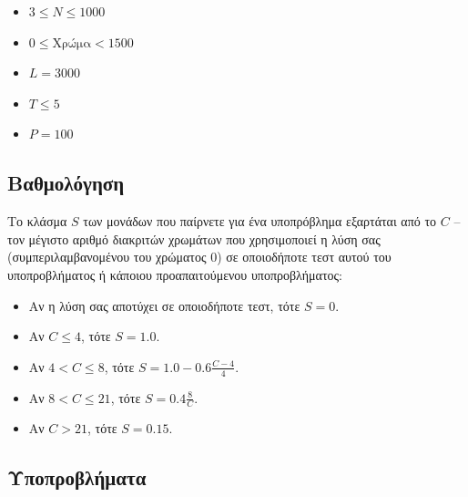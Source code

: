 \documentclass[12pt]{article}
\begin{document}
\begin{itemize}
\item $3 \leq N \leq 1000$
\item $0 \leq \mathrm{Χρώμα} < 1500$
\item $L = 3000$
\item $T \leq 5$
\item $P = 100$
\end{itemize}

\subsection{Βαθμολόγηση}

Το κλάσμα $S$ των μονάδων που παίρνετε για ένα υποπρόβλημα εξαρτάται από το $C$ -- τον μέγιστο αριθμό διακριτών χρωμάτων που χρησιμοποιεί η λύση σας (συμπεριλαμβανομένου του χρώματος $0$) σε οποιοδήποτε τεστ αυτού του υποπροβλήματος ή κάποιου προαπαιτούμενου υποπροβλήματος:

\begin{itemize}
\item Αν η λύση σας αποτύχει σε οποιοδήποτε τεστ, τότε $S = 0$.
\item Αν $C \leq 4$, τότε $S = 1.0$.
\item Αν $4 < C \leq 8$, τότε $S = 1.0 - 0.6 \frac{C - 4}{4}$.
\item Αν $8 < C \leq 21$, τότε $S = 0.4 \frac{8}{C}$.
\item Αν $C > 21$, τότε $S = 0.15$.
\end{itemize}

\subsection{Υποπροβλήματα}
\end{document}
